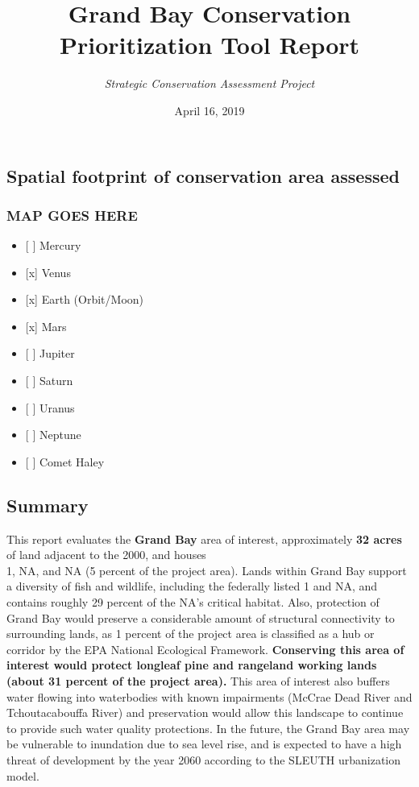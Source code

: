 \documentclass[]{article}
\title{\textbf{Grand Bay} Conservation Prioritization Tool Report}
\author{\emph{Strategic Conservation Assessment Project}}
\date{April 16, 2019}
\providecommand{\tightlist}{%
  \setlength{\itemsep}{0pt}\setlength{\parskip}{0pt}}
\begin{document}
\maketitle

\subsection{Spatial footprint of conservation area
assessed}\label{spatial-footprint-of-conservation-area-assessed}

\subsubsection{\texorpdfstring{\textbf{MAP GOES
HERE}}{MAP GOES HERE}}\label{map-goes-here}

\begin{itemize}
\tightlist
\item
  {[} {]} Mercury
\item
  {[}x{]} Venus
\item
  {[}x{]} Earth (Orbit/Moon)
\item
  {[}x{]} Mars
\item
  {[} {]} Jupiter
\item
  {[} {]} Saturn
\item
  {[} {]} Uranus
\item
  {[} {]} Neptune
\item
  {[} {]} Comet Haley
\end{itemize}

\subsection{\texorpdfstring{\textbf{Summary}}{Summary}}\label{summary}

This report evaluates the \textbf{Grand Bay} area of interest,
approximately \textbf{32 acres} of land adjacent to the 2000, and
houses\\
1, NA, and NA (5 percent of the project area). Lands within Grand Bay
support a diversity of fish and wildlife, including the federally listed
1 and NA, and contains roughly 29 percent of the NA's critical habitat.
Also, protection of Grand Bay would preserve a considerable amount of
structural connectivity to surrounding lands, as 1 percent of the
project area is classified as a hub or corridor by the EPA National
Ecological Framework. \textbf{Conserving this area of interest would
protect longleaf pine and rangeland working lands (about 31 percent of
the project area).} This area of interest also buffers water flowing
into waterbodies with known impairments (McCrae Dead River and
Tchoutacabouffa River) and preservation would allow this landscape to
continue to provide such water quality protections. In the future, the
Grand Bay area may be vulnerable to inundation due to sea level rise,
and is expected to have a high threat of development by the year 2060
according to the SLEUTH urbanization model.
\end{document}
